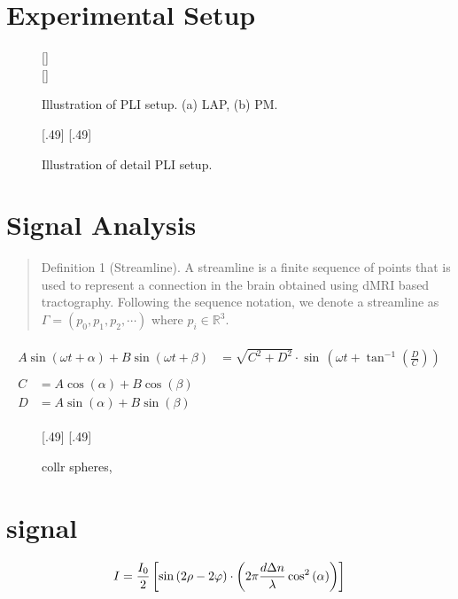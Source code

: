 \section{Experimental Setup}
%
\begin{figure}[!t]
    \captionsetup[sub]{position=top}
    \def\tikzwidth{\textwidth}
	\centering
	\subcaptionbox{}[\textwidth]{
	}\\
	\subcaptionbox{}[\textwidth]{
	}
	\caption{Illustration of PLI setup. (a) LAP, (b) PM.}
	\label{fig:pli_setup}
\end{figure}
%
\begin{figure}[!t]
    \def\tikzwidth{0.49*\textwidth}
	\centering
	[.49\textwidth]{
			}\hfill
	[.49\textwidth]{
			}
	\label{fig:pli_detail}
	\caption{Illustration of detail PLI setup.}
\end{figure}
%
% 
\section{Signal Analysis}
% 
\begin{quote}
Definition 1 (Streamline).
A streamline is a finite sequence of points that is used to represent a connection in the brain obtained using dMRI based tractography.
Following the sequence notation, we denote a streamline as $\Gamma = (p_0, p_1, p_2, \cdots )$ where $p_i \in \mathbb{R}^3$. %
\end{quote}

\begin{align}
\begin{split}
A \sin(\omega t + \alpha) + B \sin(\omega t + \beta) &= \sqrt{C^2 + D^2} \cdot \sin \, \left( \omega t + \tan^{-1} \left( \frac{D}{C} \right) \right)
\end{split}
\\
\begin{split}
C &= A \cos(\alpha)+ B \cos(\beta)\\
D &= A \sin(\alpha)+ B \sin(\beta)
\end{split} \nonumber 
\end{align}
% 
\begin{figure}[!t]
\centering
\def\tikzwidth{0.45*\textwidth}
[.49\textwidth]{
}
[.49\textwidth]{
}
\caption{collr spheres, }
\label{fig:spheres}
\end{figure}
% 
% 
% 
\section{signal}
% 
\begin{align}
I = \frac{I_0}{2} \left[ \sin\left(2\rho - 2\varphi\right) \cdot \left( 2\pi\frac{d \textnormal{$\Delta n$}}{\lambda} \cos^2\left( \alpha \right) \right)  \right]
\end{align}